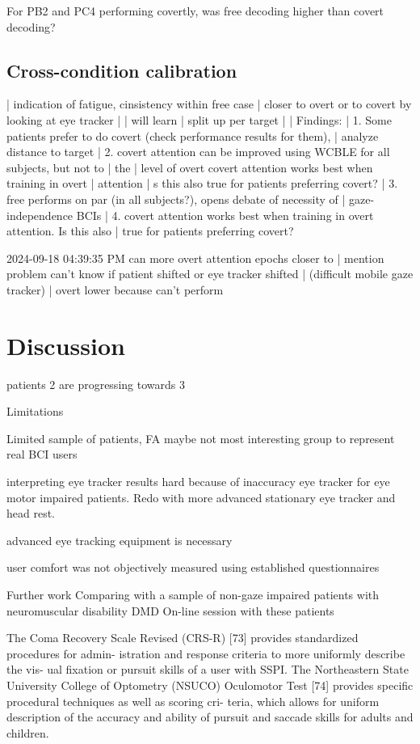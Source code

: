 For PB2 and PC4 performing covertly, was free decoding higher than covert
decoding?

\subsection{Cross-condition calibration}

| indication of fatigue, cinsistency within free case
| closer to overt or to covert by looking at eye tracker
|
| will learn
| split up per target
|
| Findings:
| 1. Some patients prefer to do covert (check performance results for them),
|    analyze distance to target
| 2. covert attention can be improved using WCBLE for all subjects, but not to
| the
|    level of overt covert attention works best when training in overt
| attention
| s this also true for patients preferring covert?
| 3. free performs on par (in all subjects?), opens debate of necessity of
|    gaze-independence BCIs
| 4. covert attention works best when training in overt attention. Is this also
|    true for patients preferring covert?

2024-09-18 04:39:35 PM can more overt attention epochs closer to
| mention problem can't know if patient shifted or eye tracker shifted
| (difficult mobile gaze tracker)
| overt lower because can't perform

\section{Discussion}

patients 2 are progressing towards 3

Limitations

Limited sample of patients, FA maybe not most interesting group to represent
real BCI users

interpreting eye tracker results hard because of inaccuracy eye tracker for eye
motor impaired patients. Redo with more advanced stationary eye tracker and
head rest.

advanced eye tracking equipment is necessary

user comfort was not objectively measured using established questionnaires

Further work
Comparing with a sample of non-gaze impaired patients with  neuromuscular
disability DMD
On-line session with these patients

The Coma Recovery Scale
Revised (CRS-R) [73] provides standardized procedures for admin-
istration and response criteria to more uniformly describe the vis-
ual fixation or pursuit skills of a user with SSPI. The Northeastern
State University College of Optometry (NSUCO) Oculomotor Test
[74] provides specific procedural techniques as well as scoring cri-
teria, which allows for uniform description of the accuracy and
ability of pursuit and saccade skills for adults and children.

